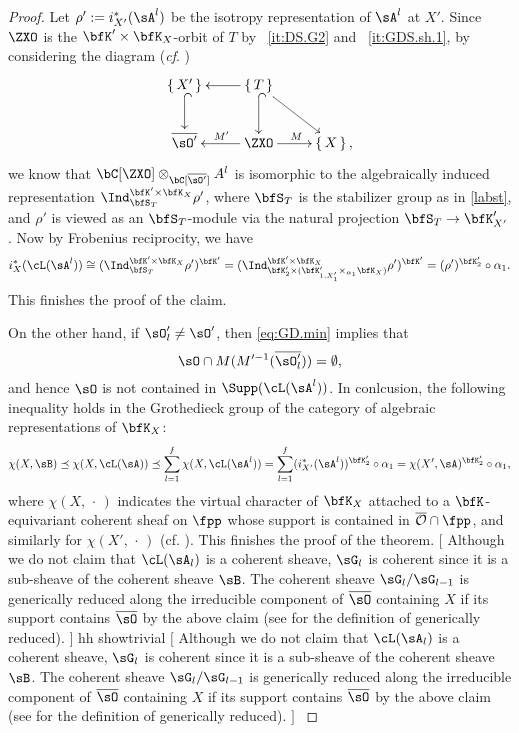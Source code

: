 \documentclass[12pt,a4paper]{amsart}
\newcommand{\trivial}[2][]{\if\relax\detokenize{#1}\relax
  {%
      \color{orange} \vspace{0em} $[$  #2 $]$
      \color{black}
  }
  \else
\ifx#1h
\ifcsname showtrivial\endcsname
{%
    \color{orange} \vspace{0em}  $[$ #2 $]$
    \color{black}
}
\fi
\else {\red Wrong argument!} \fi
\fi
}
\newcommand{\CO}{{\mathcal {O}}}
\numberwithin{equation}{section}
\theoremstyle{remark}
\def\slift{\cL}
\def\bsO{\overline{\sO}}
\def\bsOp{\overline{\sO'}}
\begin{document}
\begin{proof}
Let $\rho':=i^*_{X'}(\sA^l)$ be the isotropy
representation of $\sA^l$ at $X'$.
  Since  $\ZXO$ is the $\bfK'\times \bfK_X$-orbit of $T$ by
~\ref{it:DS.G2} and  ~\ref{it:GDS.sh.1}, by  considering  the diagram (\emph{cf}. \cite[Section~4.2]{LM})
  \[
    \xymatrix{
      \set{X'} \ar@{^(->}[d]& \ar[l] \ar[rd]\ar@{^(->}[d] \set{T}&\\
      \bsOp & \ar[l]_{M'} \ar[r]^{M}\ZXO & \set{X},}
  \]
we know that
$\bC[\ZXO]\otimes_{\bC[\bsOp]}A^l$ is
  isomorphic to the algebraically induced representation $\Ind_{\bfS_T}^{\bfK'\times \bfK_X} \rho'$, where $\bfS_T$ is the stabilizer  group as in \eqref{labst}, and $\rho'$ is
  viewed as an $\bfS_T$-module via the natural projection
  $\bfS_T\rightarrow \bfK'_{X'}$.  Now by Frobenius reciprocity, we have
  \[
    i^*_{X}(\slift(\sA^l))
    \cong (\Ind_{\bfS_T}^{\bfK'\times \bfK_X} \rho')^{\bfK'} =
    (\Ind_{\bfK'_2\times (\bfK'_{1,X'_1}\times_{\alpha_1}\bfK_X)}^{\bfK'\times
      \bfK_X} \rho')^{\bfK'} = (\rho')^{\bfK'_2} \circ \alpha_1.
  \]
  This finishes the proof of the claim.

\medskip

On the other hand,   if $\sO'_l\neq \sO'$, then \cref{eq:GD.min} implies that
$$\sO\cap  M(M'^{-1}(\overline{\sO'_l})) = \emptyset,$$
and hence $\sO$ is not contained in $\Supp(\cL(\sA^l))$. %
In conlcusion, the following inequality holds in the Grothedieck group of the category of algebraic representations of $\bfK_X$:
\[
  \chi(X, \sB)\preceq  \chi(X, \slift(\sA))\preceq \sum_{l=1}^f \chi(X, \slift(\sA^l))=\sum_{l=1}^f (i^*_{X'}(\sA^l))^{\bfK'_2} \circ \alpha_1=\chi(X', \sA)^{\bfK'_2}\circ \alpha_1,
\]
where $\chi(X,\,\cdot\,)$ indicates the  virtual character
of $\bfK_X$ attached to a $\bfK$-equivariant coherent sheaf on $\fpp$ whose
support is contained in $\overline \CO\cap \fpp$, and similarly for
$\chi(X',\,\cdot\,)$ (cf. \cite[Definition~2.12]{Vo89}).
This finishes the proof of the theorem.
\trivial[h]{Although we do
  not claim that $\slift(\sA_l)$ is a coherent sheave, $\sG_l$ is coherent since
  it is a sub-sheave of the coherent sheave $\sB$.  The coherent sheave
  $\sG_l/\sG_{l-1}$ is generically reduced along the irreducible component of
  $\bsO$ containing $X$ if its support contains $\bsO$ by the above claim (see
  \cite[Proposition~2.9 (d)]{Vo89} for the definition of generically reduced).
}
\end{proof}
\end{document}
